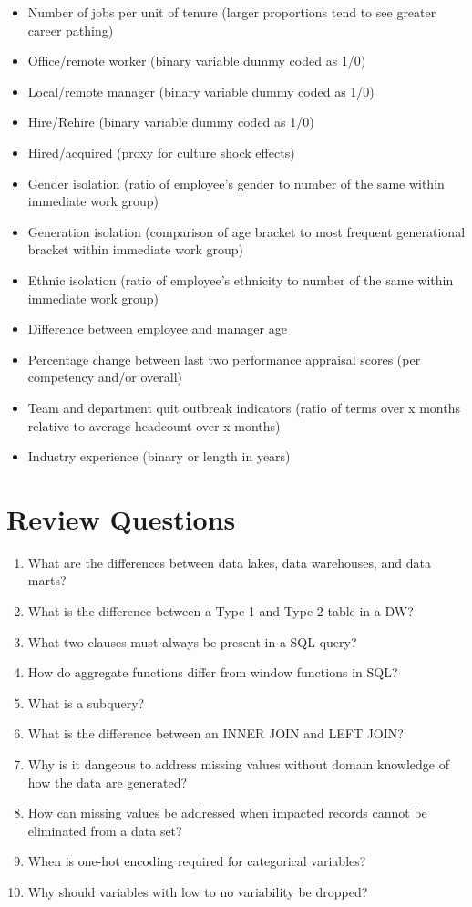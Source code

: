 \documentclass[]{book}
\providecommand{\tightlist}{%
  \setlength{\itemsep}{0pt}\setlength{\parskip}{0pt}}
\begin{document}
\begin{itemize}
\tightlist
\item
  Number of jobs per unit of tenure (larger proportions tend to see greater career pathing)
\item
  Office/remote worker (binary variable dummy coded as 1/0)
\item
  Local/remote manager (binary variable dummy coded as 1/0)
\item
  Hire/Rehire (binary variable dummy coded as 1/0)
\item
  Hired/acquired (proxy for culture shock effects)
\item
  Gender isolation (ratio of employee's gender to number of the same within immediate work
  group)
\item
  Generation isolation (comparison of age bracket to most frequent generational bracket within
  immediate work group)
\item
  Ethnic isolation (ratio of employee's ethnicity to number of the same within immediate work
  group)
\item
  Difference between employee and manager age
\item
  Percentage change between last two performance appraisal scores (per competency and/or
  overall)
\item
  Team and department quit outbreak indicators (ratio of terms over x months relative to average
  headcount over x months)
\item
  Industry experience (binary or length in years)
\end{itemize}

\hypertarget{review-questions-5}{%
\section{Review Questions}\label{review-questions-5}}

\begin{enumerate}
\def\labelenumi{\arabic{enumi}.}
\item
  What are the differences between data lakes, data warehouses, and data marts?
\item
  What is the difference between a Type 1 and Type 2 table in a DW?
\item
  What two clauses must always be present in a SQL query?
\item
  How do aggregate functions differ from window functions in SQL?
\item
  What is a subquery?
\item
  What is the difference between an INNER JOIN and LEFT JOIN?
\item
  Why is it dangeous to address missing values without domain knowledge of how the data are generated?
\item
  How can missing values be addressed when impacted records cannot be eliminated from a data set?
\item
  When is one-hot encoding required for categorical variables?
\item
  Why should variables with low to no variability be dropped?
\end{enumerate}
\end{document}
